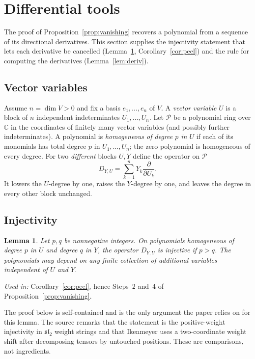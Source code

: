 \documentclass[11pt]{article}
\newtheorem{lemma}[theorem]{Lemma}
\theoremstyle{remark}
\newcommand{\C}{\mathbb C}
\newcommand{\D}[2]{D_{#1,#2}}
\newcommand{\PP}{\mathcal P}
\begin{document}
\section{Differential tools}\label{sec:differential}

The proof of Proposition~\ref{prop:vanishing} recovers a polynomial from a
sequence of its directional derivatives. This section supplies the
injectivity statement that lets each derivative be cancelled
(Lemma~\ref{lem:shift}, Corollary~\ref{cor:peel}) and the rule for
computing the derivatives (Lemma~\ref{lem:deriv}).

\subsection{Vector variables}

Assume $n=\dim V>0$ and fix a basis $e_1,\dots,e_n$ of $V$. A \emph{vector
variable} $U$ is a block of $n$ independent indeterminates
$U_1,\ldots,U_n$. Let $\PP$ be a polynomial ring over $\C$ in the
coordinates of finitely many vector variables (and possibly further
indeterminates). A polynomial is \emph{homogeneous of degree $p$ in $U$} if
each of its monomials has total degree $p$ in $U_1,\dots,U_n$; the zero
polynomial is homogeneous of every degree. For two \emph{different} blocks
$U,Y$ define the operator on $\PP$
\[
 \D{Y}{U}=\sum_{k=1}^n Y_k\frac{\partial}{\partial U_k}.
\]
It lowers the $U$-degree by one, raises the $Y$-degree by one, and leaves
the degree in every other block unchanged.

\subsection{Injectivity}

\begin{lemma}\label{lem:shift}
Let $p,q$ be nonnegative integers. On polynomials homogeneous of degree $p$
in $U$ and degree $q$ in $Y$, the operator $\D{Y}{U}$ is injective if
$p>q$. The polynomials may depend on any finite collection of additional
variables independent of $U$ and $Y$.
\end{lemma}

\noindent\emph{Used in:} Corollary~\ref{cor:peel}, hence Steps~2 and~4 of
Proposition~\ref{prop:vanishing}.

The proof below is self-contained and is the only argument the paper relies
on for this lemma. The source remarks that the statement is the
positive-weight injectivity in $\mathfrak{sl}_2$ weight strings
\cite[Section~11.1, Claim~11.4 and equation~(11.5)]{FultonHarris} and that
Ikenmeyer \cite[Section~5, Claim~5.1]{Ikenmeyer} uses a two-coordinate
weight shift after decomposing tensors by untouched positions. These are
comparisons, not ingredients.
\end{document}

